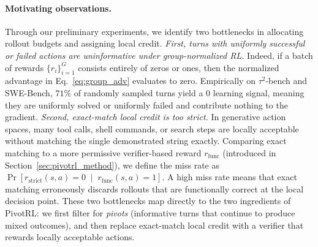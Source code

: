 \paragraph{Motivating observations.}
Through our preliminary experiments, we identify two bottlenecks in allocating rollout budgets and assigning local credit. \emph{First, turns with uniformly successful or failed actions are uninformative under group-normalized RL.} Indeed, if a batch of rewards $\{r_i\}_{i=1}^G$ consists entirely of zeros or ones, then the normalized advantage in Eq.~\eqref{eq:group_adv} evaluates to zero. Empirically on $\tau^2$-bench and SWE-Bench, $71\%$ of randomly sampled turns yield a $0$ learning signal, meaning they are uniformly solved or uniformly failed and contribute nothing to the gradient. \emph{Second, exact-match local credit is too strict.} In generative action spaces, many tool calls, shell commands, or search steps are locally acceptable without matching the single demonstrated string exactly. Comparing exact matching to a more permissive verifier-based reward $r_{\mathrm{func}}$ (introduced in Section~\ref{sec:pivotrl_method}), we define the miss rate as $\Pr\!\left[
r_{\mathrm{strict}}(s,a)=0
\;\middle|\;
r_{\mathrm{func}}(s,a)=1
\right].$
A high miss rate means that exact matching erroneously discards rollouts that are functionally correct at the local decision point. These two bottlenecks map directly to the two ingredients of PivotRL: we first filter for \emph{pivots} (informative turns that continue to produce mixed outcomes), and then replace exact-match local credit with a verifier that rewards locally acceptable actions.
